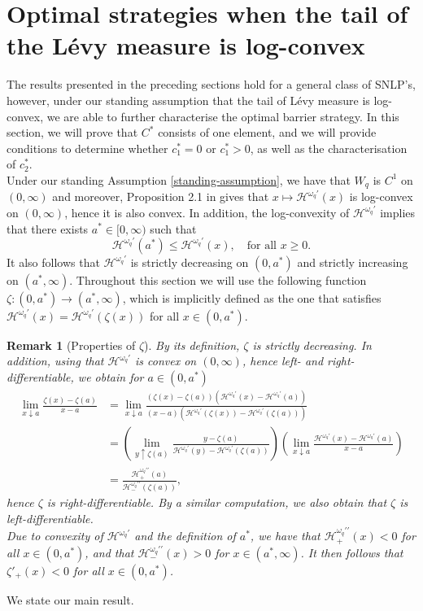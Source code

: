 \documentclass[10pt,a4paper]{amsart}
\newtheorem{remark}{Remark}[section]
\newcommand{\cH}{\mathcal{H}}
\newcommand{\homega}{\omega_q}
\newcommand{\PAR}[1]{{{\left(#1\right)}}} %
\renewcommand{\leq}{\leqslant}
\renewcommand{\geq}{\geqslant}
\begin{document}
\section{Optimal strategies when the tail of the L\'evy measure is log-convex}\label{Sec:Optim:Convex}
The results presented in the preceding sections hold for a general class of SNLP's, however, under our standing assumption that the tail of L\'evy measure is log-convex, we are able to further characterise the optimal barrier strategy. In this section, we will prove that $C^\ast$ consists of one element, and we will provide conditions to determine whether $c_1^\ast = 0$ or $c_1^\ast > 0$, as well as the characterisation of $c^\ast_2$.\\
Under our standing Assumption \ref{standing-assumption}, we have that $W_q$ is $C^1$ on $(0,\infty)$ and moreover, Proposition 2.1 in \cite{mata-renaud_2024} gives that $x \mapsto \cH^{\homega\prime}(x)$ is log-convex on $(0,\infty)$, hence it is also convex. In addition, the log-convexity of $\cH^{\homega\prime}$ implies that there exists $a^\ast \in [0,\infty)$ such that
\[
\cH^{\homega\prime}(a^\ast) \leq \cH^{\homega\prime}(x), \quad \text{for all } x\geq 0.
\]
It also follows that $\cH^{\homega\prime}$ is strictly decreasing on $(0,a^\ast)$ and strictly increasing on $(a^\ast,\infty)$. Throughout this section we will use the following function $\zeta : (0,a^\ast) \to (a^\ast,\infty)$, which is implicitly defined as the one that satisfies $\cH^{\homega\prime}(x) = \cH^{\homega\prime}(\zeta(x))$ for all $x \in (0,a^\ast)$.
\begin{remark}[Properties of $\zeta$]
	By its definition, $\zeta$ is strictly decreasing. In addition, using that $\cH^{\homega\prime}$ is convex on $(0,\infty)$, hence left- and right-differentiable, we obtain for $a \in (0,a^\ast)$
	\begin{align*}
		\lim_{x \downarrow a} \frac{\zeta(x)-\zeta(a)}{x-a} &= \lim_{x\downarrow a}\frac{(\zeta(x)-\zeta(a))(\cH^{\homega\prime}(x) - \cH^{\homega\prime}(a))}{(x-a)(\cH^{\homega\prime}(\zeta(x)) - \cH^{\homega\prime}(\zeta(a)))}\\
		&= \PAR{\lim_{y \uparrow \zeta(a)}\frac{y - \zeta(a)}{\cH^{\homega\prime}(y) - \cH^{\homega\prime}(\zeta(a))} }\PAR{\lim_{x\downarrow a}\frac{ \cH^{\homega\prime}(x) - \cH^{\homega\prime}(a) }{x-a}}\\
		&= \frac{\cH^{\homega\prime\prime}_+(a)}{\cH^{\homega\prime\prime}_-(\zeta(a))},
	\end{align*}
	hence $\zeta$ is right-differentiable. By a similar computation, we also obtain that $\zeta$ is left-differentiable.\\
	Due to convexity of $\cH^{\homega\prime}$ and the definition of $a^\ast$, we have that $\cH^{\homega\prime\prime}_+(x)<0$ for all $x \in (0,a^\ast)$, and that $\cH^{\homega\prime\prime}_-(x)>0$ for $x \in (a^\ast,\infty)$. It then follows that $\zeta'_+(x) < 0$ for all $x \in (0,a^\ast)$.\\
\end{remark}
We state our main result.
\end{document}

